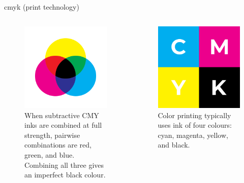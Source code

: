 \documentclass[aspectratio=169,xcolor={dvipsnames,svgnames}]{beamer}
\begin{document}
\begin{frame}[label={sec:org78cc9f3}]{cmyk (print technology)}
\begin{columns}
\begin{column}{.5\columnwidth}
\begin{figure}[htbp]
\centering
\includegraphics[width=0.65\linewidth]{images/CMYK_color_model.svg.png}
\caption{When subtractive CMY inks are combined at full strength, pairwise combinations are red, green, and blue. Combining all three gives an imperfect black colour.}
\end{figure}
\end{column}

\begin{column}{.5\columnwidth}
\begin{figure}[htbp]
\centering
\includegraphics[width=0.65\linewidth]{images/CMYK_Color_Swatches.svg.png}
\caption{Color printing typically uses ink of four colours: cyan, magenta, yellow, and black.}
\end{figure}
\end{column}
\end{columns}
\end{frame}
\end{document}
